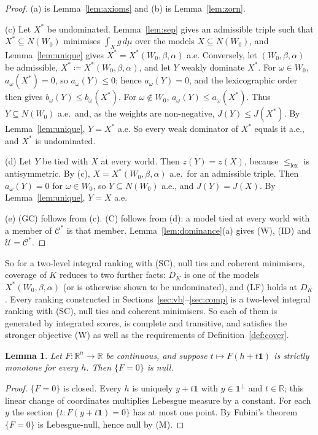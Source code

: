 \documentclass[11pt]{article}
\newcommand{\R}{\mathbb{R}}
\newcommand{\one}{\mathbf{1}}
\newcommand{\lexle}{\le_{\mathrm{lex}}}
\theoremstyle{plain}
\newtheorem{lemma}[theorem]{Lemma}
\theoremstyle{definition}
\theoremstyle{remark}
\begin{document}
\begin{proof}
(a) is Lemma~\ref{lem:axioms} and (b) is Lemma~\ref{lem:zorn}.

(c) Let $X^\ast$ be undominated. Lemma~\ref{lem:sep} gives an admissible triple such that
$X^\ast\subseteq N(W_0)$ minimises $\int_Xg\,d\mu$ over the models $X\subseteq N(W_0)$, and
Lemma~\ref{lem:unique} gives $X^\ast=X^\ast(W_0,\beta,\alpha)$ a.e. Conversely, let
$(W_0,\beta,\alpha)$ be admissible, $X^\ast\coloneqq X^\ast(W_0,\beta,\alpha)$, and let $Y$
weakly dominate $X^\ast$. For $\omega\in W_0$, $a_\omega(X^\ast)=0$, so $a_\omega(Y)\le0$;
hence $a_\omega(Y)=0$, and the lexicographic order then gives $b_\omega(Y)\le
b_\omega(X^\ast)$. For $\omega\notin W_0$, $a_\omega(Y)\le a_\omega(X^\ast)$. Thus
$Y\subseteq N(W_0)$ a.e.\ and, as the weights are non-negative, $J(Y)\le J(X^\ast)$. By
Lemma~\ref{lem:unique}, $Y=X^\ast$ a.e. So every weak dominator of $X^\ast$ equals it
a.e., and $X^\ast$ is undominated.

(d) Let $Y$ be tied with $X$ at every world. Then $z(Y)=z(X)$, because $\lexle$ is
antisymmetric. By (c), $X=X^\ast(W_0,\beta,\alpha)$ a.e.\ for an admissible triple. Then
$a_\omega(Y)=0$ for $\omega\in W_0$, so $Y\subseteq N(W_0)$ a.e., and $J(Y)=J(X)$. By
Lemma~\ref{lem:unique}, $Y=X$ a.e.

(e) (GC) follows from (c). (C) follows from (d): a model tied at every world with a member
of $\mathcal C^\ast$ is that member. Lemma~\ref{lem:dominance}(a) gives (W), (ID) and
$\mathcal U=\mathcal C^\ast$.
\end{proof}

So for a two-level integral ranking with (SC), null ties and coherent minimisers, coverage
of $K$ reduces to two further facts: $D_K$ is one of the models $X^\ast(W_0,\beta,\alpha)$
(or is otherwise shown to be undominated), and (LF) holds at $D_K$. Every ranking
constructed in Sections~\ref{sec:vb}--\ref{sec:comp} is a two-level integral ranking with
(SC), null ties and coherent minimisers. So each of them is generated by integrated
scores, is complete and transitive, and satisfies the stronger objective (W) as well as
the requirements of Definition~\ref{def:cover}.

\begin{lemma}\label{lem:fubini}
Let $F:\R^n\to\R$ be continuous, and suppose $t\mapsto F(h+t\one)$ is strictly monotone
for every $h$. Then $\{F=0\}$ is null.
\end{lemma}

\begin{proof}
$\{F=0\}$ is closed. Every $h$ is uniquely $y+t\one$ with $y\in\one^\perp$ and $t\in\R$;
this linear change of coordinates multiplies Lebesgue measure by a constant. For each $y$
the section $\{t:F(y+t\one)=0\}$ has at most one point. By Fubini's theorem $\{F=0\}$ is
Lebesgue-null, hence null by (M).
\end{proof}
\end{document}
